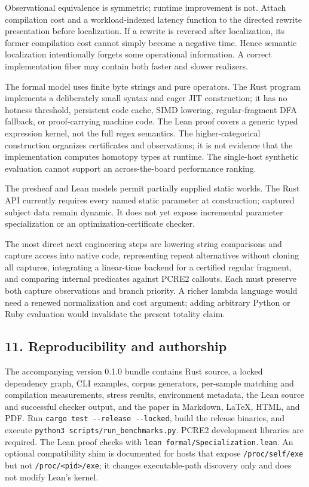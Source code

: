 \documentclass[
  11pt,
]{article}
\begin{document}
Observational equivalence is symmetric; runtime improvement is not.
Attach compilation cost and a workload-indexed latency function to the
directed rewrite presentation before localization. If a rewrite is
reversed after localization, its former compilation cost cannot simply
become a negative time. Hence semantic localization intentionally
forgets some operational information. A correct implementation fiber may
contain both faster and slower realizers.

The formal model uses finite byte strings and pure operators. The Rust
program implements a deliberately small syntax and eager JIT
construction; it has no hotness threshold, persistent code cache, SIMD
lowering, regular-fragment DFA fallback, or proof-carrying machine code.
The Lean proof covers a generic typed expression kernel, not the full
regex semantics. The higher-categorical construction organizes
certificates and observations; it is not evidence that the
implementation computes homotopy types at runtime. The single-host
synthetic evaluation cannot support an across-the-board performance
ranking.

The presheaf and Lean models permit partially supplied static worlds.
The Rust API currently requires every named static parameter at
construction; captured subject data remain dynamic. It does not yet
expose incremental parameter specialization or an
optimization-certificate checker.

The most direct next engineering steps are lowering string comparisons
and capture access into native code, representing repeat alternatives
without cloning all captures, integrating a linear-time backend for a
certified regular fragment, and comparing internal predicates against
PCRE2 callouts. Each must preserve both capture observations and branch
priority. A richer lambda language would need a renewed normalization
and cost argument; adding arbitrary Python or Ruby evaluation would
invalidate the present totality claim.

\hypertarget{reproducibility-and-authorship}{%
\subsection{11. Reproducibility and
authorship}\label{reproducibility-and-authorship}}

The accompanying version 0.1.0 bundle contains Rust source, a locked
dependency graph, CLI examples, corpus generators, per-sample matching
and compilation measurements, stress results, environment metadata, the
Lean source and successful checker output, and the paper in Markdown,
LaTeX, HTML, and PDF. Run \texttt{cargo\ test\ -\/-release\ -\/-locked},
build the release binaries, and execute
\texttt{python3\ scripts/run\_benchmarks.py}. PCRE2 development
libraries are required. The Lean proof checks with
\texttt{lean\ formal/Specialization.lean}. An optional compatibility
shim is documented for hosts that expose \texttt{/proc/self/exe} but not
\texttt{/proc/\textless{}pid\textgreater{}/exe}; it changes
executable-path discovery only and does not modify Lean's kernel.
\end{document}
